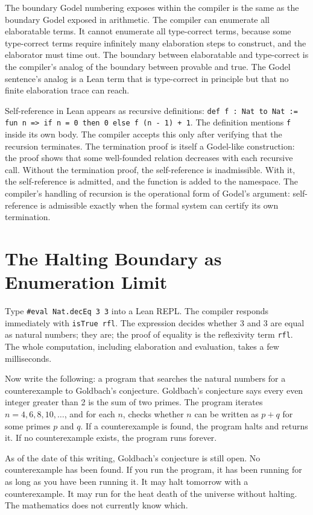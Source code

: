The boundary Godel numbering exposes within the compiler is the same as the
boundary Godel exposed in arithmetic. The compiler can enumerate all
elaboratable terms. It cannot enumerate all type-correct terms, because some
type-correct terms require infinitely many elaboration steps to construct,
and the elaborator must time out. The boundary between elaboratable and
type-correct is the compiler's analog of the boundary between provable and
true. The Godel sentence's analog is a Lean term that is type-correct in
principle but that no finite elaboration trace can reach.

Self-reference in Lean appears as recursive definitions: \texttt{def f : Nat
to Nat := fun n => if n = 0 then 0 else f (n - 1) + 1}. The definition
mentions \texttt{f} inside its own body. The compiler accepts this only after
verifying that the recursion terminates. The termination proof is itself a
Godel-like construction: the proof shows that some well-founded relation
decreases with each recursive call. Without the termination proof, the
self-reference is inadmissible. With it, the self-reference is admitted, and
the function is added to the namespace. The compiler's handling of recursion
is the operational form of Godel's argument: self-reference is admissible
exactly when the formal system can certify its own termination.

\section{The Halting Boundary as Enumeration Limit}
\label{se:halting-boundary}

Type \texttt{\#eval Nat.decEq 3 3} into a Lean REPL. The compiler responds
immediately with \texttt{isTrue rfl}. The expression decides whether 3 and 3
are equal as natural numbers; they are; the proof of equality is the
reflexivity term \texttt{rfl}. The whole computation, including elaboration
and evaluation, takes a few milliseconds.

Now write the following: a program that searches the natural numbers for a
counterexample to Goldbach's conjecture. Goldbach's conjecture says every
even integer greater than 2 is the sum of two primes. The program iterates
$n = 4, 6, 8, 10, \ldots$, and for each $n$, checks whether $n$ can be
written as $p + q$ for some primes $p$ and $q$. If a counterexample is
found, the program halts and returns it. If no counterexample exists, the
program runs forever.

As of the date of this writing, Goldbach's conjecture is still open. No
counterexample has been found. If you run the program, it has been running
for as long as you have been running it. It may halt tomorrow with a
counterexample. It may run for the heat death of the universe without
halting. The mathematics does not currently know which.


